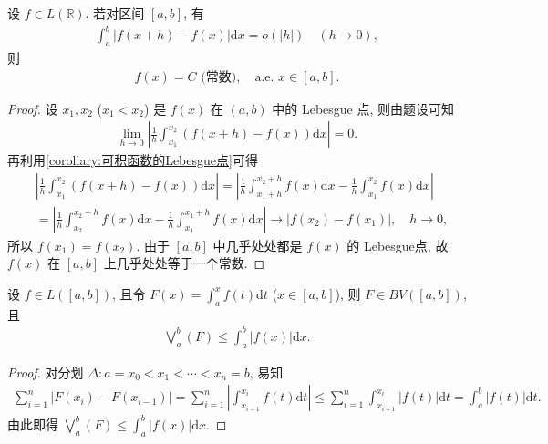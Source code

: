 \documentclass[../../main.tex]{subfiles}%
\begin{document}
\begin{proposition}
设 $f\in L(\mathbb{R})$. 若对区间 $[a,b]$, 有
\begin{align*}
\int_a^b |f(x+h)-f(x)|\mathrm{d}x = o(|h|) \quad (h\to 0),
\end{align*}
则
\begin{align*}
f(x) = C \text{ (常数)}, \quad \text{a.e. } x\in[a,b].
\end{align*}
\end{proposition}
\begin{proof}
设 $x_1,x_2$ ($x_1<x_2$) 是 $f(x)$ 在 $(a,b)$ 中的 Lebesgue 点, 则由题设可知
\begin{align*}
\lim_{h\to 0} \left|\frac{1}{h}\int_{x_1}^{x_2} (f(x+h)-f(x))\mathrm{d}x\right| = 0.
\end{align*}
再利用\cref{corollary:可积函数的Lebesgue点}可得
\begin{align*}
&\left|\frac{1}{h}\int_{x_1}^{x_2} (f(x+h)-f(x))\mathrm{d}x\right|
= \left|\frac{1}{h}\int_{x_1+h}^{x_2+h} f(x)\mathrm{d}x - \frac{1}{h}\int_{x_1}^{x_2} f(x)\mathrm{d}x\right| \\
&= \left|\frac{1}{h}\int_{x_2}^{x_2+h} f(x)\mathrm{d}x - \frac{1}{h}\int_{x_1}^{x_1+h} f(x)\mathrm{d}x\right| 
\to |f(x_2)-f(x_1)|, \quad h\to 0,
\end{align*}
所以 $f(x_1)=f(x_2)$. 由于 $[a,b]$ 中几乎处处都是 $f(x)$ 的 Lebesgue点, 故 $f(x)$ 在 $[a,b]$ 上几乎处处等于一个常数.
\end{proof}

\begin{proposition}
设 $f\in L([a,b])$, 且令 $F(x)=\int_a^x f(t)\mathrm{d}t$ ($x\in[a,b]$), 则 $F\in  BV([a,b])$, 且
\begin{align*}
\bigvee_a^b(F) \leqslant \int_a^b |f(x)|\mathrm{d}x.
\end{align*}
\end{proposition}
\begin{proof}
对分划 $\Delta: a=x_0<x_1<\cdots<x_n=b$, 易知
\begin{align*}
\sum_{i=1}^n |F(x_i)-F(x_{i-1})| = \sum_{i=1}^n \left|\int_{x_{i-1}}^{x_i} f(t)\mathrm{d}t\right| 
\leqslant \sum_{i=1}^n \int_{x_{i-1}}^{x_i} |f(t)|\mathrm{d}t = \int_a^b |f(t)|\mathrm{d}t.
\end{align*}
由此即得 $\bigvee_a^b(F)\leqslant\int_a^b |f(x)|\mathrm{d}x$.
\end{proof}
\end{document}
